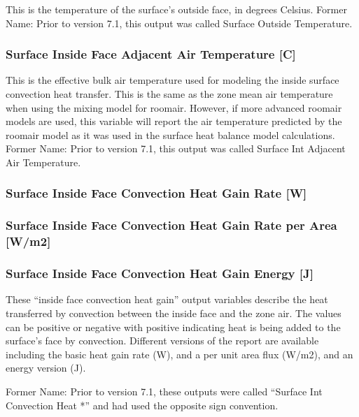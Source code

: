 This is the temperature of the surface's outside face, in degrees Celsius. Former Name: Prior to version 7.1, this output was called Surface Outside Temperature.

\subsubsection{Surface Inside Face Adjacent Air Temperature {[}C{]}}\label{surface-inside-face-adjacent-air-temperature-c}

This is the effective bulk air temperature used for modeling the inside surface convection heat transfer. This is the same as the zone mean air temperature when using the mixing model for roomair. However, if more advanced roomair models are used, this variable will report the air temperature predicted by the roomair model as it was used in the surface heat balance model calculations. Former Name: Prior to version 7.1, this output was called Surface Int Adjacent Air Temperature.

\subsubsection{Surface Inside Face Convection Heat Gain Rate {[}W{]}}\label{surface-inside-face-convection-heat-gain-rate-w}

\subsubsection{Surface Inside Face Convection Heat Gain Rate per Area {[}W/m2{]}}\label{surface-inside-face-convection-heat-gain-rate-per-area-wm2}

\subsubsection{Surface Inside Face Convection Heat Gain Energy {[}J{]}}\label{surface-inside-face-convection-heat-gain-energy-j}

These ``inside face convection heat gain'' output variables describe the heat transferred by convection between the inside face and the zone air. The values can be positive or negative with positive indicating heat is being added to the surface's face by convection. Different versions of the report are available including the basic heat gain rate (W), and a per unit area flux (W/m2), and an energy version (J).

Former Name: Prior to version 7.1, these outputs were called ``Surface Int Convection Heat *'' and had used the opposite sign convention.


